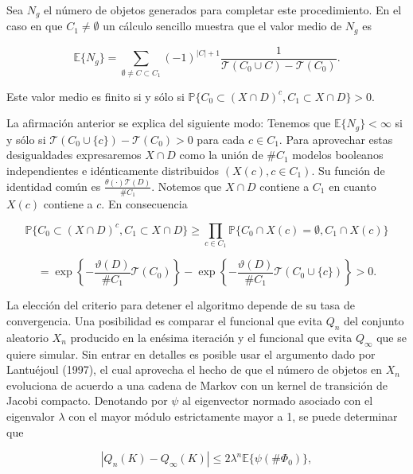 Sea $N_g$ el n\'umero de objetos generados para completar este procedimiento. En el caso en que $C_1\neq\emptyset$ un c\'alculo sencillo muestra que el valor medio de $N_g$ es

\[\mathbb{E}\{N_g\}=\sum_{\emptyset\neq C\subset C_1}(-1)^{|C|+1}\frac{1}{\mathcal{T}(C_0\cup C)-\mathcal{T}(C_0)}.\]

Este valor medio es finito si y s\'olo si $\mathbb{P}\{C_0\subset (X\cap D)^c,C_1\subset X\cap D\}>0.$

La afirmaci\'on anterior se explica del siguiente modo: Tenemos que $\mathbb{E}\{N_g\}<\infty$ si y s\'olo si $\mathcal{T}(C_0\cup\{c\})-\mathcal{T}(C_0)>0$ para cada $c\in C_1$. Para aprovechar estas desigualdades expresaremos $X\cap D$ como la uni\'on de $\#C_1$ modelos booleanos independientes e id\'enticamente distribuidos $(X(c),c\in C_1)$. Su funci\'on de identidad com\'un es $\frac{\theta(\cdot)\mathcal{T}(D)}{\#C_1}$. Notemos que $X\cap D$ contiene a $C_1$ en cuanto $X(c)$ contiene a $c$. En consecuencia

\[\mathbb{P}\{C_0\subset(X\cap D)^c,C_1\subset X\cap D\}\geq\prod_{c\in C_1}\mathbb{P}\{C_0\cap X(c)=\emptyset,C_1\cap X(c)\}\]

\[=\exp\left\{-\frac{\vartheta(D)}{\#C_1}\mathcal{T}(C_0)\right\}-\exp\left\{-\frac{\vartheta(D)}{\#C_1}\mathcal{T}(C_0\cup\{c\})\right\}>0.\]

La elecci\'on del criterio para detener el algoritmo depende de su tasa de convergencia. Una posibilidad es comparar el funcional que evita $Q_n$ del conjunto aleatorio $X_n$ producido en la en\'esima iteraci\'on y el funcional que evita $Q_\infty$ que se quiere simular. Sin entrar en detalles es posible usar el argumento dado por Lantu\'ejoul (1997), el cual aprovecha el hecho de que el n\'umero de objetos en $X_n$ evoluciona de acuerdo a una cadena de Markov con un kernel de transici\'on de Jacobi compacto. Denotando por $\psi$ al eigenvector normado asociado con el eigenvalor $\lambda$ con el mayor m\'odulo estrictamente mayor a 1, se puede determinar que

\[|Q_n(K)-Q_\infty(K)|\leq2\lambda^n\mathbb{E}\{\psi(\#\Phi_0)\},\]

\vspace{0.1in}

